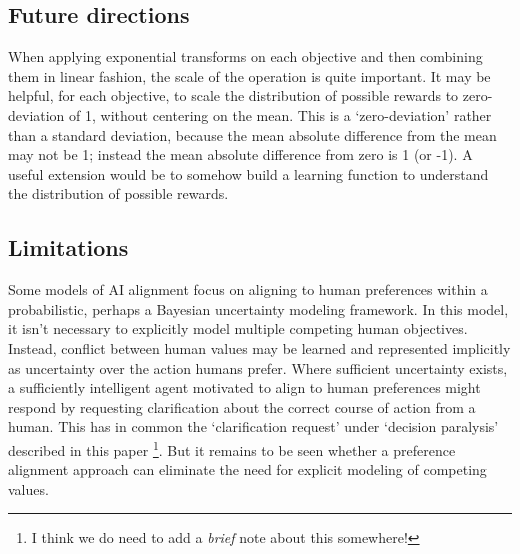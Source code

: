 


\subsection{Future directions}

When applying exponential transforms on each objective and then combining them in linear fashion, the scale of the operation is quite important. It may be helpful, for each objective, to scale the distribution of possible rewards to zero-deviation of 1, without centering on the mean. This is a `zero-deviation' rather than a standard deviation, because the mean absolute difference from the mean may not be 1; instead the mean absolute difference from zero is 1 (or -1). A useful extension would be to somehow build a learning function to understand the distribution of possible rewards.

\subsection{Limitations}

Some models of AI alignment focus on \cite{russell2019human} aligning to human preferences within a probabilistic, perhaps a Bayesian uncertainty modeling framework.  In this model, it isn't necessary to explicitly model multiple competing human objectives. Instead, conflict between human values may be learned and represented implicitly as uncertainty over the action humans prefer. Where sufficient uncertainty exists, a sufficiently intelligent agent motivated to align to human preferences might respond by requesting clarification about the correct course of action from a human. This has in common the `clarification request' under `decision paralysis' described in this paper \footnote{I think we do need to add a \textit{brief} note about this somewhere!}. But it remains to be seen whether a preference alignment approach can eliminate the need for explicit modeling of competing values.